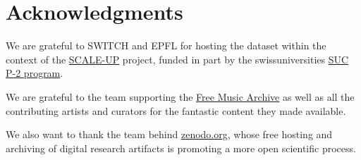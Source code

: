 \documentclass{article}
\begin{document}


\section{Acknowledgments}


We are grateful to SWITCH and EPFL for hosting the dataset within the context
of the \href{https://projects.switch.ch/scale-up}{SCALE-UP} project, funded in
part by the swissuniversities \href{http://www.swissuniversities.ch/isci}{SUC
P-2 program}.

We are grateful to the team supporting the \href{https://freemusicarchive.org}{Free Music Archive} as well as all the contributing artists and curators for the fantastic content they made available.

We also want to thank the team behind \href{https://zenodo.org}{zenodo.org}, whose free hosting and archiving of digital research artifacts is promoting a more open scientific process.


\end{document}
